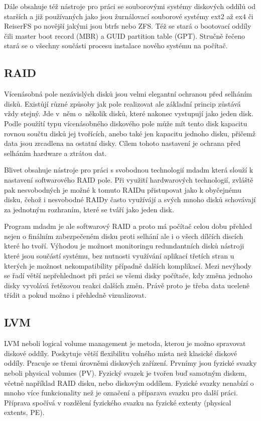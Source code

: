 \documentclass[color,table,oneside,nolot,nolof]{fithesis}
\begin{document}
	Dále obsahuje též nástroje pro práci se souborovými systémy diskových oddílů od starších a již používaných jako jsou žurnálovací souborové systémy ext2 až ex4 či ReiserFS po novější
	jakými jsou btrfs nebo ZFS. Též se stará o bootovací oddíly čili master boot record (MBR) a GUID partition table (GPT). Stručně řečeno stará se o všechny součásti procesu instalace
	nového systému na počítač.

\subsection{RAID}
	Vícenásobná pole nezávislých disků jsou velmi elegantní ochranou před selháním disků. Existůjí různé způsoby jak pole realizovat ale základní princip zůstává vždy stejný. Jde v~něm
	o~několik disků, které nakonec vystupují jako jeden disk. Podle použítí typu vícenásobného diskového pole může mít tento disk kapacitu rovnou součtu disků jej tvořících, anebo také
	jen kapacitu jednoho disku, přičemž data jsou zrcadlena na ostatní disky. Cílem tohoto nastavení je ochrana před selháním hardware a ztrátou dat. 
	
	Blivet obsahuje nástroje pro práci s svobodnou technologií mdadm která slouží k nastavení softwarového RAID pole. Při využití hardwarových technologií, zvláště pak nesvobodných
	je možné k tomuto RAIDu přistupovat jako k obyčejnému disku, čehož i nesvobodné RAIDy často využívájí a svých mnoho disků schovávají za jednotným rozhraním, které se tváří jako jeden
	disk. 

	Program mdadm je ale softwarový RAID a proto má počítač celou dobu přehled nejen o finálním zabezpečeném disku proti selhání ale i o všech dílčích discích které ho tvoří. Výhodou je
	možnost monitoringu redundantních disků nástroji které jsou součástí systému, bez nutnosti využívání aplikací třetích stran u kterých je možnost nekompatibility případně dalších 
	komplikací.
	Mezi nevýhody se řadí větší nepřehlednost při práci se všemi disky počítače, kdy změna jednoho disky vyvolává řetězovou reakci dalších změn. Právě proto je třeba data uceleně třídit
	a pokud možno i přehledně vizualizovat.

\subsection{LVM}
  LVM neboli logical volume management je metoda, kterou je možno spravovat diskové oddíly. Poskytuje větší flexibilitu volného místa než klasické diskové oddíly. Pracuje se třemi
	úrovněmi
	diskových zařízení. Prvnímy jsou fyzické svazky neboli physical volumes (PV). Fyzický svazek je tvořen buď samotným diskem, včetně například RAID disku, nebo diskovým oddílem. 
	Fyzické
	svazky nenabízí o mnoho více funkcionality než je označení a příparava svazku pro další práci. Příprava spočívá v rozdělení fyzického svazku na fyzické extenty (physical extents, PE).
\end{document}
